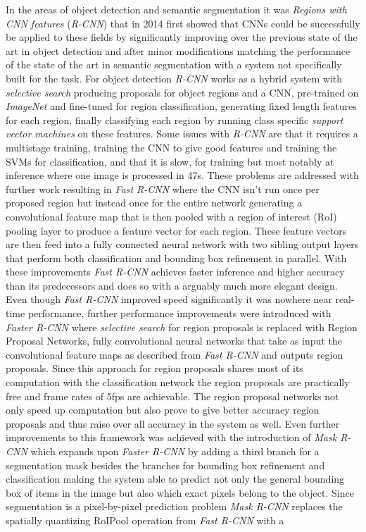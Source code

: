 \documentclass[11pt]{article}
\newcommand{\bibentry}[1]{\cite{#1}}
\begin{document}
In the areas of object detection and semantic segmentation it was \emph{Regions with CNN features} (\emph{R-CNN})\bibentry{girshick2014rich} that in 2014 first showed that CNNs could be successfully be applied to these fields by significantly improving over the previous state of the art in object detection \bibentry{ren2013histograms} and after minor modifications matching the performance of the state of the art in semantic segmentation\bibentry{carreira2012semantic} with a system not specifically built for the task. For object detection \emph{R-CNN} works as a hybrid system with \emph{selective search}\bibentry{uijlings2013selective} producing proposals for object regions and a CNN, pre-trained on \emph{ImageNet}\bibentry{deng2009imagenet} and fine-tuned for region classification, generating fixed length features for each region, finally classifying each region by running class specific \emph{support vector machines}\bibentry{boser1992training} on these features. Some issues with \emph{R-CNN} are that it requires a multistage training, training the CNN to give good features and training the SVMs for classification, and that it is slow, for training but most notably at inference where one image is processed in 47s. These problems are addressed with further work resulting in \emph{Fast R-CNN} \bibentry{girshick2015fast} where the CNN isn't run once per proposed region but instead once for the entire network generating a convolutional feature map that is then pooled with a region of interest (RoI) pooling layer to produce a feature vector for each region. These feature vectors are then feed into a fully connected neural network with two sibling output layers that perform both classification and bounding box refinement in parallel. With these improvements \emph{Fast R-CNN} achieves faster inference and higher accuracy than its predecessors and does so with a arguably much more elegant design. Even though \emph{Fast R-CNN} improved speed significantly it was nowhere near real-time performance, further performance improvements were introduced with \emph{Faster R-CNN}\bibentry{ren2015faster} where \emph{selective search} for region proposals is replaced with Region Proposal Networks, fully convolutional neural networks that take as input the convolutional feature maps as described from \emph{Fast R-CNN} and outputs region proposals. Since this approach for region proposals shares most of its computation with the classification network the region proposals are practically free and frame rates of 5fps are achievable. The region proposal networks not only speed up computation but also prove to give better accuracy region proposals and thus raise over all accuracy in the system as well\bibentry{ren2015faster}. Even further improvements to this framework was achieved with the introduction of \emph{Mask R-CNN}\bibentry{he2017mask} which expands upon \emph{Faster R-CNN} by adding a third branch for a segmentation mask besides the branches for bounding box refinement and classification making the system able to predict not only the general bounding box of items in the image but also which exact pixels belong to the object. Since segmentation is a pixel-by-pixel prediction problem \emph{Mask R-CNN} replaces the spatially quantizing RoIPool operation from \emph{Fast R-CNN} with a 
\end{document}

